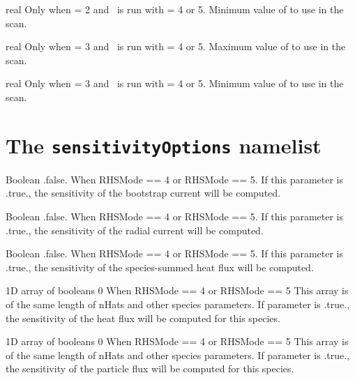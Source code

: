 \myhrule

{real}
{Only when  = 2 and \sfincsScan~is run with  = 4 or 5.}
{Minimum value of  to use in the scan.}

\myhrule

{real}
{Only when  = 3 and \sfincsScan~is run with  = 4 or 5.}
{Maximum value of  to use in the scan.}

\myhrule

{real}
{Only when  = 3 and \sfincsScan~is run with  = 4 or 5.}
{Minimum value of  to use in the scan.}

\section{The \texttt{sensitivityOptions} namelist}

{Boolean}
{{\ttfamily .false. }}
{When {\ttfamily RHSMode == 4} or {\ttfamily RHSMode == 5}. }
{If this parameter is {\ttfamily .true.}, the sensitivity of the bootstrap current will be computed.}

\myhrule

{Boolean}
{{\ttfamily .false. }}
{When {\ttfamily RHSMode == 4} or {\ttfamily RHSMode == 5}. }
{If this parameter is {\ttfamily .true.}, the sensitivity of the radial current will be computed.}

\myhrule

{Boolean}
{{\ttfamily .false. }}
{When {\ttfamily RHSMode == 4} or {\ttfamily RHSMode == 5}. }
{If this parameter is {\ttfamily .true.}, the sensitivity of the species-summed heat flux will be computed.}

\myhrule

{1D array of booleans}
{0}
{When {\ttfamily RHSMode == 4} or {\ttfamily RHSMode == 5}} 
{This array is of the same length of {\ttfamily nHats} and other species parameters. If parameter is {\ttfamily .true.}, the sensitivity of the heat flux will be computed for this species.}

\myhrule

{1D array of booleans}
{0}
{When {\ttfamily RHSMode == 4} or {\ttfamily RHSMode == 5}}
{This array is of the same length of {\ttfamily nHats} and other species parameters. If parameter is {\ttfamily .true.}, the sensitivity of the particle flux will be computed for this species.}

